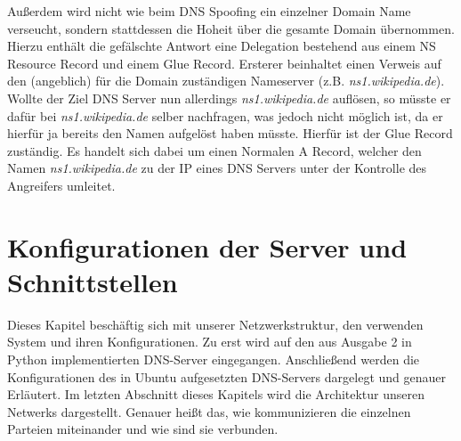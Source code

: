 \documentclass[10pt,a4paper]{article}
\begin{document}
Außerdem wird nicht wie beim DNS Spoofing ein einzelner Domain Name verseucht, sondern stattdessen die Hoheit über die gesamte Domain übernommen. Hierzu enthält die gefälschte Antwort eine Delegation bestehend aus einem NS Resource Record und einem Glue Record. Ersterer beinhaltet einen Verweis auf den (angeblich) für die Domain zuständigen Nameserver (z.B. \emph{ns1.wikipedia.de}). Wollte der Ziel DNS Server nun allerdings \emph{ns1.wikipedia.de} auflösen, so müsste er dafür bei \emph{ns1.wikipedia.de} selber nachfragen, was jedoch nicht möglich ist, da er hierfür ja bereits den Namen aufgelöst haben müsste. Hierfür ist der Glue Record zuständig. Es handelt sich dabei um einen Normalen A Record, welcher den Namen \emph{ns1.wikipedia.de} zu der IP eines DNS Servers unter der Kontrolle des Angreifers umleitet.


\section{Konfigurationen der Server und Schnittstellen}
Dieses Kapitel beschäftig sich mit unserer Netzwerkstruktur, den verwenden System und ihren Konfigurationen. Zu erst wird auf den aus Ausgabe 2 in Python implementierten DNS-Server eingegangen. Anschließend werden die Konfigurationen des in Ubuntu aufgesetzten DNS-Servers dargelegt und genauer Erläutert. Im letzten Abschnitt dieses Kapitels wird die Architektur unseren Netwerks dargestellt. Genauer heißt das, wie kommunizieren die einzelnen Parteien miteinander und wie sind sie verbunden.
\end{document}
